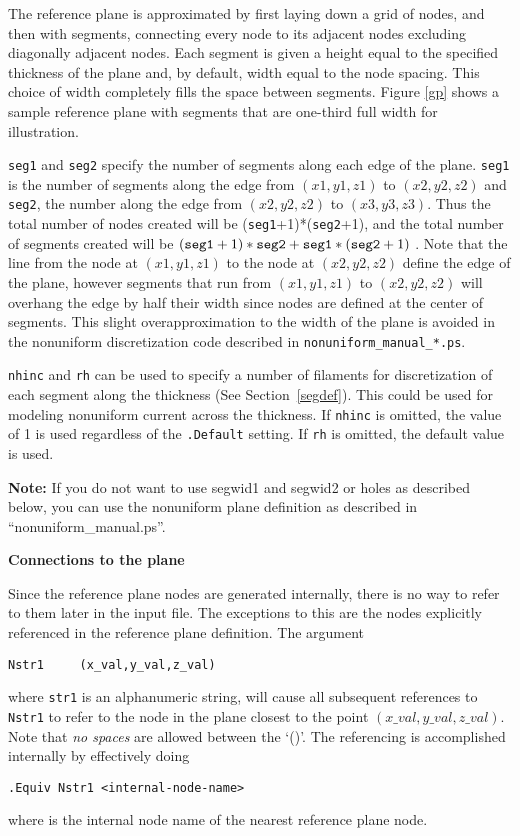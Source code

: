 The reference plane is approximated by first laying down a
grid of nodes, and then with segments, connecting every
node to its adjacent nodes excluding diagonally adjacent nodes.  Each
segment is given a height equal to the specified thickness of the
plane and, by default, width equal to the node 
spacing.  This choice of width completely fills the
space between segments.  Figure \ref{gp} shows a sample reference plane
with segments that are one-third full width for illustration.

{\tt seg1} and {\tt seg2} specify the number of segments along each
edge of the plane.  {\tt seg1} is the number of segments along
the edge from $(x1,y1,z1) $ to $(x2,y2,z2)$ and {\tt seg2}, the number
along the edge from $(x2,y2,z2) $ to $ (x3, y3, z3)$.  Thus the total
number of nodes created will be ({\tt seg1}+1)*({\tt seg2}+1), and the
total number of segments created will be $ ({\tt seg1} + 1)*{\tt seg2}
+ {\tt seg1}*({\tt seg2} + 1)$ .  Note that the line from the node at
$(x1,y1,z1)$ to the node at
$(x2,y2,z2)$ define the edge of the plane, however segments that
run from $(x1,y1,z1) $ to $(x2,y2,z2)$ will overhang the edge by half
their width since nodes are defined at the center of segments. This
slight overapproximation to the width of the plane is avoided in the
nonuniform discretization code described in {\tt nonuniform\_manual\_*.ps}.

{\tt nhinc} and {\tt rh} can be used to specify a number of filaments
for discretization of each segment along the thickness (See
Section~\ref{segdef}). This could be used for modeling nonuniform
current across the thickness.  If {\tt nhinc} is omitted, the value
of 1 is used regardless of the {\tt .Default}
setting.  If {\tt rh} is omitted, the default value is used.

{\bf Note:} If you do not want to use segwid1 and segwid2 or holes as
described below, you can use the nonuniform plane
definition as described in ``nonuniform\_manual.ps''.

\vspace{0.3in}
{\bf \noindent Connections to the plane}

Since the reference plane nodes are generated internally, 
there is no way to
refer to them later in the input file.  The exceptions to this are the
nodes explicitly referenced in the reference plane definition.  The
argument
\begin{verbatim}
Nstr1     (x_val,y_val,z_val)
\end{verbatim}
where {\tt str1} is an alphanumeric string, will cause all subsequent
references to {\tt Nstr1} to refer to the node in the plane closest to
the point $(x\_val,y\_val,z\_val)$.  Note that {\em no spaces} are
allowed between the `()'.  The referencing is accomplished internally
by effectively doing
\begin{verbatim}
.Equiv Nstr1 <internal-node-name>
\end{verbatim}
where {\tt <internal-node-name>} is the internal node name of the
nearest reference plane node.  

